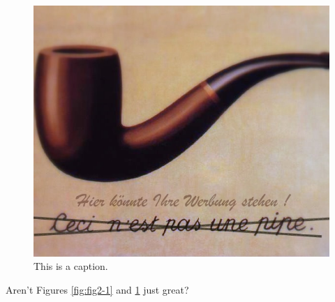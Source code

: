 \begin{figure}
\centering
\includegraphics[width=\textwidth]{figures/Part2/random_image_2.png}%
\caption{This is a caption.}
\label{fig:fig2-2}
\end{figure}



\lipsum[1-2]

Aren't Figures \ref{fig:fig2-1} and \ref{fig:fig2-2} just great?



